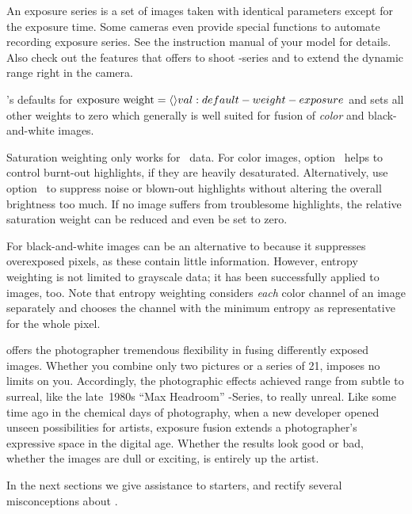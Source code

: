 
An exposure series is a set of images taken with identical parameters except for the exposure
time.  Some cameras even provide special functions to automate recording exposure series.  See
the instruction manual of your model for details.  Also check out the features that
 offers to shoot -series and to extend the
dynamic range right in the camera.

\App{}'s defaults for $\mbox{exposure weight} = \val*{val:default-weight-exposure}$ and sets all
other weights to zero which generally is well suited for fusion of \emph{color} and
black-and-white images.

Saturation weighting only works for ~data.  For color images,
option~ helps to control burnt-out highlights, if they are heavily
desaturated.  Alternatively, use option~ to suppress noise or
blown-out highlights without altering the overall brightness too much.  If no image suffers from
troublesome highlights, the relative saturation weight can be reduced and even be set to zero.

For black-and-white images  can be an alternative to
 because it suppresses overexposed pixels, as these contain little
information.  However, entropy weighting is not limited to grayscale data; it has been
successfully applied to  images, too.  Note that entropy weighting considers
\emph{each} color channel of an  image separately and chooses the channel with the
minimum entropy as representative for the whole pixel.

\App{} offers the photographer tremendous flexibility in fusing differently exposed images.
Whether you combine only two pictures or a series of 21, \App{} imposes no limits on you.
Accordingly, the photographic effects achieved range from subtle to surreal, like the late~1980s
``Max Headroom'' -Series, to really unreal.  Like some time ago in the chemical days
of photography, when a new developer opened unseen possibilities for artists, exposure fusion
extends a photographer's expressive space in the digital age.  Whether the results look good or
bad, whether the images are dull or exciting, is entirely up the artist.

In the next sections we give assistance to starters, and rectify several misconceptions about
\App{}.


